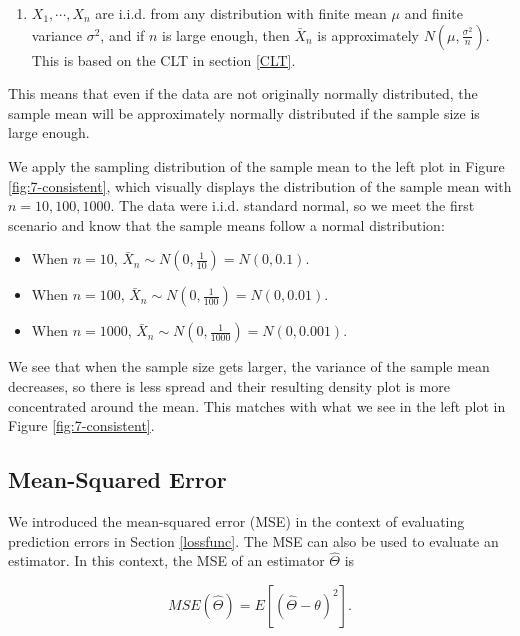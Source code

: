 \documentclass[
]{book}
\providecommand{\tightlist}{%
  \setlength{\itemsep}{0pt}\setlength{\parskip}{0pt}}
\begin{document}
\begin{enumerate}
\def\labelenumi{\arabic{enumi}.}
\setcounter{enumi}{1}
\tightlist
\item
  \(X_1, \cdots, X_n\) are i.i.d. from any distribution with finite mean \(\mu\) and finite variance \(\sigma^2\), and if \(n\) is large enough, then \(\bar{X}_n\) is approximately \(N(\mu, \frac{\sigma^2}{n})\). This is based on the CLT in section \ref{CLT}.
\end{enumerate}

This means that even if the data are not originally normally distributed, the sample mean will be approximately normally distributed if the sample size is large enough.

We apply the sampling distribution of the sample mean to the left plot in Figure \ref{fig:7-consistent}, which visually displays the distribution of the sample mean with \(n=10, 100, 1000\). The data were i.i.d. standard normal, so we meet the first scenario and know that the sample means follow a normal distribution:

\begin{itemize}
\tightlist
\item
  When \(n=10\), \(\bar{X}_n \sim N(0, \frac{1}{10}) = N(0, 0.1)\).
\item
  When \(n=100\), \(\bar{X}_n \sim N(0, \frac{1}{100}) = N(0,0.01)\).
\item
  When \(n=1000\), \(\bar{X}_n \sim N(0, \frac{1}{1000}) = N(0,0.001)\).
\end{itemize}

We see that when the sample size gets larger, the variance of the sample mean decreases, so there is less spread and their resulting density plot is more concentrated around the mean. This matches with what we see in the left plot in Figure \ref{fig:7-consistent}.

\subsection{Mean-Squared Error}\label{mean-squared-error}

We introduced the mean-squared error (MSE) in the context of evaluating prediction errors in Section \ref{lossfunc}. The MSE can also be used to evaluate an estimator. In this context, the MSE of an estimator \(\hat{\Theta}\) is

\begin{equation} 
MSE(\hat{\Theta}) = E\left[(\hat{\Theta} - \theta)^2 \right].
\label{eq:7-MSE}
\end{equation}
\end{document}
